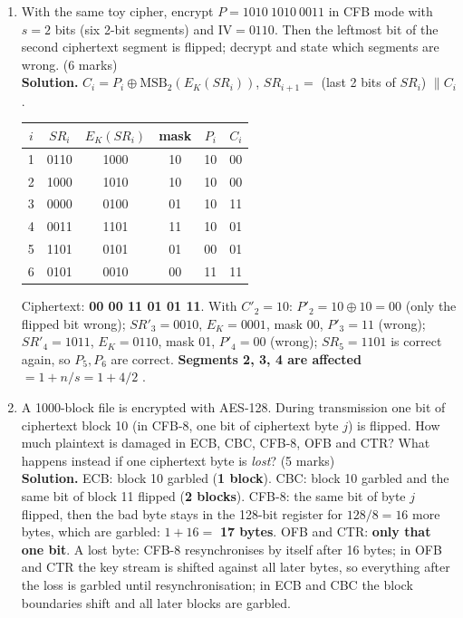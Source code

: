 \begin{enumerate}[leftmargin=1.6em,itemsep=4pt]
  \item With the same toy cipher, encrypt $P = 1010\ 1010\ 0011$ in CFB mode with $s = 2$ bits (six 2-bit segments) and $\mathrm{IV} = 0110$. Then the leftmost bit of the second ciphertext segment is flipped; decrypt and state which segments are wrong. \hfill (6 marks)\\
  \textbf{Solution.} $C_i = P_i \oplus \mathrm{MSB}_2(E_K(SR_i))$, $SR_{i+1} = $ (last 2 bits of $SR_i$) $\| C_i$.
  \begin{center}\small
  \begin{tabular}{@{}c c c c c c@{}}
  \toprule
  $i$ & $SR_i$ & $E_K(SR_i)$ & mask & $P_i$ & $C_i$\\
  \midrule
  1 & 0110 & 1000 & 10 & 10 & 00\\
  2 & 1000 & 1010 & 10 & 10 & 00\\
  3 & 0000 & 0100 & 01 & 10 & 11\\
  4 & 0011 & 1101 & 11 & 10 & 01\\
  5 & 1101 & 0101 & 01 & 00 & 01\\
  6 & 0101 & 0010 & 00 & 11 & 11\\
  \bottomrule
  \end{tabular}
  \end{center}
  Ciphertext: \textbf{00 00 11 01 01 11}. With $C'_2 = 10$: $P'_2 = 10 \oplus 10 = 00$ (only the flipped bit wrong); $SR'_3 = 0010$, $E_K = 0001$, mask 00, $P'_3 = 11$ (wrong); $SR'_4 = 1011$, $E_K = 0110$, mask 01, $P'_4 = 00$ (wrong); $SR_5 = 1101$ is correct again, so $P_5, P_6$ are correct. \textbf{Segments 2, 3, 4 are affected} $= 1 + n/s = 1 + 4/2$ \checkmark.

  \item A 1000-block file is encrypted with AES-128. During transmission one bit of ciphertext block 10 (in CFB-8, one bit of ciphertext byte $j$) is flipped. How much plaintext is damaged in ECB, CBC, CFB-8, OFB and CTR? What happens instead if one ciphertext byte is \emph{lost}? \hfill (5 marks)\\
  \textbf{Solution.} ECB: block 10 garbled (\textbf{1 block}). CBC: block 10 garbled and the same bit of block 11 flipped (\textbf{2 blocks}). CFB-8: the same bit of byte $j$ flipped, then the bad byte stays in the 128-bit register for $128/8 = 16$ more bytes, which are garbled: $1 + 16 = $ \textbf{17 bytes}. OFB and CTR: \textbf{only that one bit}. A lost byte: CFB-8 resynchronises by itself after 16 bytes; in OFB and CTR the key stream is shifted against all later bytes, so everything after the loss is garbled until resynchronisation; in ECB and CBC the block boundaries shift and all later blocks are garbled.


\end{enumerate}
